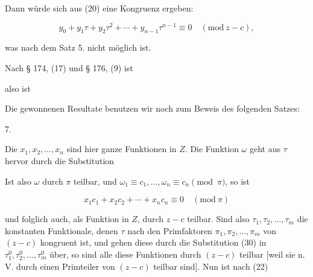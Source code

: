 
Dann würde sich aus (20) eine Kongruenz ergeben:

\[ y_0 + y_1\tau + y_2\tau^2 + \cdots + y_{n-1}\tau^{n-1} \equiv 0 \quad (\mathrm{mod}\ z-c), \]

was nach dem Satz 5. nicht möglich ist.

Nach § 174, (17) und § 176, (9) ist


also ist



Die gewonnenen Resultate benutzen wir noch zum Beweis des folgenden
Satzes:

7. 



Die $x_1, x_2, \ldots, x_n$ sind hier ganze Funktionen in $Z$. Die
Funktion $\omega$ geht aus $\tau$ hervor durch die Substitution


Ist also $\omega$ durch $\pi$ teilbar, und $\omega_1 \equiv c_1,
\ldots, \omega_n \equiv c_n \pmod{\pi}$, so ist

\[ x_1c_1 + x_2c_2 + \cdots + x_nc_n \equiv 0 \quad (\mathrm{mod}\ \pi) \]

und folglich auch, als Funktion in $Z$, durch $z-c$ teilbar. Sind
also $\tau_1, \tau_2, \ldots, \tau_m$ die konstanten Funktionale,
denen $\tau$ nach den Primfaktoren $\pi_1, \pi_2, \ldots, \pi_m$ von
$(z-c)$ kongruent ist, und gehen diese durch die Substitution (30) in
$\tau_1^0, \tau_2^0, \ldots, \tau_m^0$ über, so sind alle diese
Funktionen durch $(z-c)$ teilbar [weil sie n. V. durch einen
Primteiler von $(z-c)$ teilbar sind]. Nun ist nach (22)


